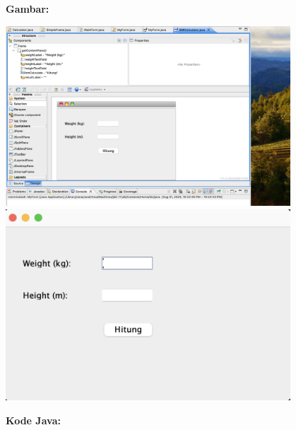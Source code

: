 \textbf{Gambar:} \\
\begin{center}
	\includegraphics[width=0.8\textwidth]{assets/pertemuan11/bmicalculator_window_builder.png}
	\includegraphics[width=0.8\textwidth]{assets/pertemuan11/bmicalculator.png}
\end{center}


\textbf{Kode Java:}

